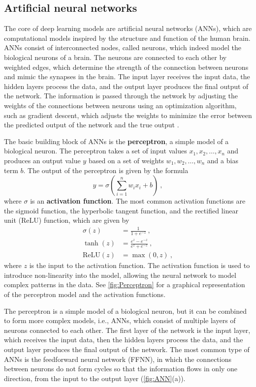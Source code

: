 \subsection{\label{sec:Artificial neural networks} Artificial neural
  networks}

The core of deep learning models are artificial neural networks (ANNs), which
are computational models inspired by the structure and function of the human
brain. ANNs consist of interconnected nodes, called neurons, which indeed
model
the biological neurons of a brain. The neurons are connected to each other by
weighted edges, which determine the strength of the connection between
neurons
and mimic the synapses in the brain. The input layer receives the input data,
the hidden layers process the data, and the output layer produces the final
output of the network. The information is passed through the network by
adjusting the weights of the connections between neurons using an
optimization
algorithm, such as gradient descent, which adjusts the weights to minimize
the
error between the predicted output of the network and the true output
\cite{Goodfellow2016}.

The basic building block of ANNs is the \textbf{perceptron}, a simple model of
a
biological neuron. The perceptron takes a set of input values $x_1, x_2,
  \ldots, x_n$ and produces an output value $y$ based on a set of weights $w_1,
  w_2, \ldots, w_n$ and a bias term $b$. The output of the perceptron is given
by the formula
\begin{equation}
  y = \sigma(\sum_{i=1}^n w_ix_i + b) \ ,
\end{equation}
where $\sigma$ is an \textbf{activation function}. The most common activation
functions are the sigmoid function, the hyperbolic tangent function, and the
rectified linear unit (ReLU) function, which are given by
\begin{align}
  \sigma(z)      & = \frac{1}{1 + e^{-z}} \ ,              \\
  \tanh(z)       & = \frac{e^z - e^{-z}}{e^z + e^{-z}} \ , \\
  \text{ReLU}(z) & = \max(0, z) \ ,
\end{align}
where $z$ is the input to the activation function. The activation function is
used to introduce non-linearity into the model, allowing the neural network
to
model complex patterns in the data. See \cref{fig:Perceptron} for a graphical
representation of the perceptron model and the activation functions.

The perceptron is a simple model of a biological neuron, but it can be
combined to form more complex models, i.e., ANNs, which consist of multiple
layers of neurons connected to each other. The first layer of the network is
the input layer, which receives the input data, then the hidden layers
process
the data, and the output layer produces the final output of the network. The
most common type of ANNs is the feedforward neural network (FFNN), in which the
connections between neurons do not form cycles so that the information flows
in only one direction, from the input to the output layer (\cref{fig:ANN}(a)).

